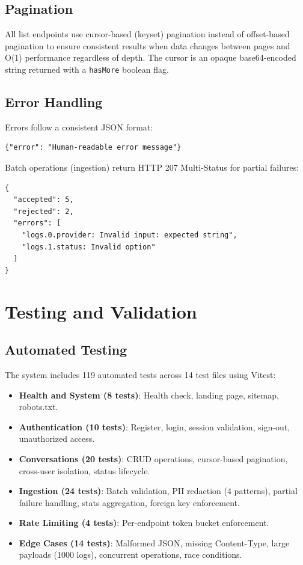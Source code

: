 \documentclass[conference]{IEEEtran}
\begin{document}
\subsection{Pagination}

All list endpoints use cursor-based (keyset) pagination instead of offset-based pagination to ensure consistent results when data changes between pages and O(1) performance regardless of depth. The cursor is an opaque base64-encoded string returned with a \texttt{hasMore} boolean flag.

\subsection{Error Handling}

Errors follow a consistent JSON format:

\begin{lstlisting}[caption=Standard error response]
{"error": "Human-readable error message"}
\end{lstlisting}

Batch operations (ingestion) return HTTP 207 Multi-Status for partial failures:

\begin{lstlisting}[caption=Partial failure response]
{
  "accepted": 5,
  "rejected": 2,
  "errors": [
    "logs.0.provider: Invalid input: expected string",
    "logs.1.status: Invalid option"
  ]
}
\end{lstlisting}

\section{Testing and Validation}

\subsection{Automated Testing}

The system includes 119 automated tests across 14 test files using Vitest:

\begin{itemize}
  \item \textbf{Health and System (8 tests)}: Health check, landing page, sitemap, robots.txt.
  \item \textbf{Authentication (10 tests)}: Register, login, session validation, sign-out, unauthorized access.
  \item \textbf{Conversations (20 tests)}: CRUD operations, cursor-based pagination, cross-user isolation, status lifecycle.
  \item \textbf{Ingestion (24 tests)}: Batch validation, PII redaction (4 patterns), partial failure handling, stats aggregation, foreign key enforcement.
  \item \textbf{Rate Limiting (4 tests)}: Per-endpoint token bucket enforcement.
  \item \textbf{Edge Cases (14 tests)}: Malformed JSON, missing Content-Type, large payloads (1000 logs), concurrent operations, race conditions.
\end{itemize}
\end{document}
